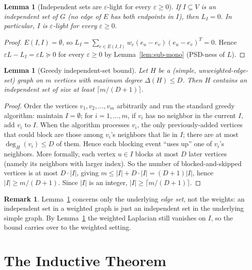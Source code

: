 \documentclass[12pt]{article}
\newtheorem{lemma}[theorem]{Lemma}
\theoremstyle{definition}
\newtheorem{remark}[theorem]{Remark}
\begin{document}
\begin{lemma}[Independent sets are $\varepsilon$-light for every $\varepsilon\ge 0$]\label{lem:indep}
If $I\subseteq V$ is an independent set of $G$ (no edge of $E$ has both endpoints in $I$), then $L_I = 0$.  In particular, $I$ is $\varepsilon$-light for every $\varepsilon\ge 0$.
\end{lemma}

\begin{proof}
$E(I,I)=\emptyset$, so $L_I = \sum_{e\in E(I,I)} w_e (e_u-e_v)(e_u-e_v)^T = 0$.  Hence $\varepsilon L - L_I = \varepsilon L\succeq 0$ for every $\varepsilon\ge 0$ by Lemma~\ref{lem:sub-mono} (PSD-ness of $L$).
\end{proof}

\begin{lemma}[Greedy independent-set bound]\label{lem:greedy-indep}
Let $H$ be a (simple, unweighted-edge-set) graph on $m$ vertices with maximum degree $\Delta(H)\le D$.  Then $H$ contains an independent set of size at least $\lceil m/(D+1)\rceil$.
\end{lemma}

\begin{proof}
Order the vertices $v_1,v_2,\ldots,v_m$ arbitrarily and run the standard greedy algorithm: maintain $I=\emptyset$; for $i=1,\ldots,m$, if $v_i$ has no neighbor in the current $I$, add $v_i$ to $I$.  When the algorithm processes $v_i$, the only previously-added vertices that could block are those among $v_i$'s neighbors that lie in $I$; there are at most $\deg_H(v_i)\le D$ of them.  Hence each blocking event ``uses up'' one of $v_i$'s neighbors.  More formally, each vertex $u\in I$ blocks at most $D$ later vertices (namely its neighbors with larger index).  So the number of blocked-and-skipped vertices is at most $D\cdot|I|$, giving $m\le |I|+D\cdot|I| = (D+1)|I|$, hence $|I|\ge m/(D+1)$.  Since $|I|$ is an integer, $|I|\ge\lceil m/(D+1)\rceil$.
\end{proof}

\begin{remark}\label{rem:weighted}
Lemma~\ref{lem:greedy-indep} concerns only the underlying \emph{edge set}, not the weights: an independent set in a weighted graph is just an independent set in the underlying simple graph.  By Lemma~\ref{lem:indep} the weighted Laplacian still vanishes on $I$, so the bound carries over to the weighted setting.
\end{remark}

\section{The Inductive Theorem}\label{sec:induction}
\end{document}
